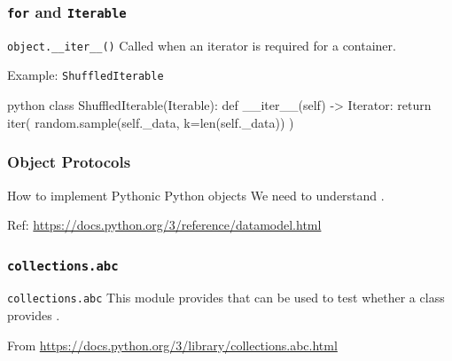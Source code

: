 \documentclass[aspectratio=169,dvipdfmx,12pt,notheorems]{beamer}
\theoremstyle{definition}
\begin{document}
\begin{frame}[fragile,shrink=4]\frametitle{\texttt{for} and \texttt{Iterable}}

\begin{block}{\texttt{object.\_\_iter\_\_()}}
Called when an iterator is required for a container. 
\end{block}

\begin{exampleblock}{Example: \texttt{ShuffledIterable}}
\begin{pygments}{python}
class ShuffledIterable(Iterable):
    def __iter__(self) -> Iterator:
        return iter(
            random.sample(self._data, k=len(self._data))
        )
\end{pygments}
\end{exampleblock}

\end{frame}

%
%
%
%

\begin{frame}\frametitle{Object Protocols}

\begin{block}{How to implement Pythonic Python objects}
We need to understand .
\end{block}
Ref: \url{https://docs.python.org/3/reference/datamodel.html}

\end{frame}

\begin{frame}\frametitle{\texttt{collections.abc}}

\begin{block}{\texttt{collections.abc}}
This module provides  that can be used to test whether a class provides .
\end{block}
From \url{https://docs.python.org/3/library/collections.abc.html}

\end{frame}
\end{document}
